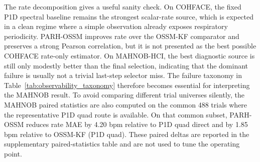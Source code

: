 \documentclass[fleqn,10pt]{wlscirep}
\begin{document}
\begin{table}[H]
\centering
\caption{Complete-cohort rate accuracy. Values are median per-trial metrics.
Base and OSSM-KF use the pre-specified representative P1D quad route where it
is computable; PARH-OSSM uses the oscillatory rate (track-Hz) readout. MAHNOB-HCI
comparator rows contain 488 computable P1D quad trials, whereas the PARH-OSSM
row describes all 525 eligible tail-aligned trials; paired MAHNOB deltas are
therefore reported separately on the common 488-trial subset. Dataset label
MAHNOB abbreviates MAHNOB-HCI.}
\label{tab:cohface_t3}
\scriptsize
\setlength{\tabcolsep}{4pt}
\end{table}
\FloatBarrier

The rate decomposition gives a useful sanity check. On COHFACE, the fixed P1D
spectral baseline remains the strongest scalar-rate source, which is expected
in a clean regime where a simple observation already exposes respiratory
periodicity. PARH-OSSM improves rate over the OSSM-KF comparator and preserves
a strong Pearson correlation, but it is not presented as the best possible
COHFACE rate-only estimator. On MAHNOB-HCI, the best diagnostic source is still
only modestly better than the final selection, indicating that the dominant
failure is usually not a trivial last-step selector miss. The failure taxonomy in
Table~\ref{tab:observability_taxonomy} therefore becomes essential for
interpreting the MAHNOB result.
To avoid comparing different trial universes silently, the MAHNOB paired
statistics are also computed on the common 488 trials where the representative
P1D quad route is available. On that common subset, PARH-OSSM reduces rate MAE
by 4.20 bpm relative to P1D quad direct and by 1.85 bpm relative to
OSSM-KF (P1D quad). These paired deltas are reported in the supplementary
paired-statistics table and are not used to tune the operating point.
\end{document}
